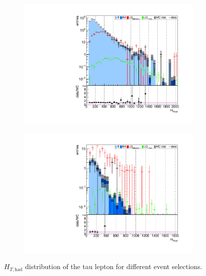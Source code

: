 \begin{figure}
\begin{subfigure}[t]{0.49\textwidth}
                \label{HThad:2b2tau}
                \end{subfigure}
                \begin{subfigure}[t]{0.49\textwidth}
                \includegraphics[width=\textwidth]{figures/plots/kinLQ75/HThad_2j1b_1tau.pdf}
                \label{HThad:1b1tau}
                \end{subfigure}
                \begin{subfigure}[t]{0.49\textwidth}
                \includegraphics[width=\textwidth]{figures/plots/kinLQ75/HThad_2j1b_2tau.pdf}
                \label{HThad:1b2tau}
                \end{subfigure}
\caption[$H_{T,\text{had}}$ distribution of the tau lepton for different event selections.]{$H_{T,\text{had}}$ distribution of the tau lepton for different event selections.}
\label{HThad}
\end{figure}
